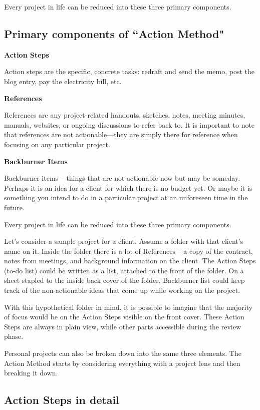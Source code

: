 Every project in life can be reduced into these three primary components.

\subsection{Primary components of ``Action Method"}

\textbf{Action Steps}

Action steps are the specific, concrete tasks: redraft and send the memo, post the blog entry, pay the electricity bill, etc.

\textbf{References}

References are any project-related handouts, sketches, notes, meeting minutes, manuals, websites, or ongoing discussions to refer back to. It is important to note that references are not actionable—they are simply there for reference when focusing on any particular project.

\textbf{Backburner Items}

Backburner items -- things that are not actionable now but may be someday. Perhaps it is an idea for a client for which there is no budget yet. Or maybe it is something you intend to do in a particular project at an unforeseen time in the future.

Every project in life can be reduced into these three primary components.

Let’s consider a sample project for a client. Assume a folder with that client’s name on it. Inside the folder there is a lot of References -- a copy of the contract, notes from meetings, and background information on the client. The Action Steps (to-do list) could be written as a list, attached to the front of the folder. On a sheet stapled to the inside back cover of the folder, Backburner list could keep track of the non-actionable ideas that come up while working on the project.

With this hypothetical folder in mind, it is possible to imagine that the majority of focus would be on the Action Steps visible on the front cover. These Action Steps are always in plain view, while other parts accessible during the review phase.

Personal projects can also be broken down into the same three elements. The Action Method starts by considering everything with a project lens and then breaking it down.

\subsection{Action Steps in detail}

